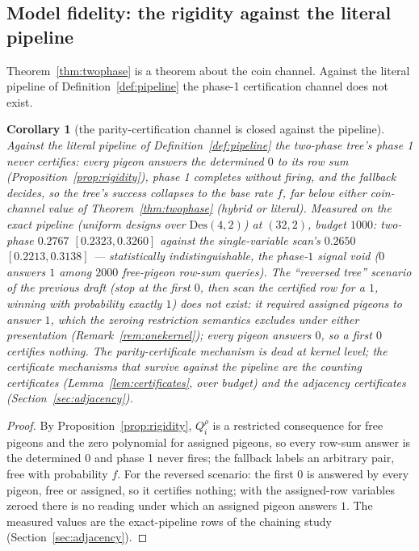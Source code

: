 \documentclass[11pt]{article}
\newtheorem{corollary}[theorem]{Corollary}
\theoremstyle{definition}
\theoremstyle{remark}
\newcommand{\Des}{\mathrm{Des}}
\begin{document}
\subsection{Model fidelity: the rigidity against the literal pipeline}

Theorem~\ref{thm:twophase} is a theorem about the coin channel.  Against
the literal pipeline of Definition~\ref{def:pipeline} the phase-1
certification channel does not exist.

\begin{corollary}[the parity-certification channel is closed against
the pipeline]\label{cor:closed}
Against the literal pipeline of Definition~\ref{def:pipeline} the
two-phase tree's phase 1 never certifies: every pigeon answers the
determined $0$ to its row sum (Proposition~\ref{prop:rigidity}), phase
1 completes without firing, and the fallback decides, so the tree's
success collapses to the base rate $f$, far below either coin-channel
value of Theorem~\ref{thm:twophase} (hybrid or literal).  Measured on
the exact pipeline (uniform designs over $\Des(4,2)$) at $(32,2)$,
budget $1000$: two-phase $0.2767$ $[0.2323,0.3260]$ against the
single-variable scan's $0.2650$ $[0.2213,0.3138]$ ---
statistically indistinguishable, the phase-$1$ signal void ($0$
answers $1$ among $2000$ free-pigeon row-sum queries).  The
``reversed tree'' scenario of the previous draft (stop at the first
$0$, then scan the certified row for a $1$, winning with probability
exactly $1$) does not exist: it required assigned pigeons to answer
$1$, which the zeroing restriction semantics excludes under either
presentation (Remark~\ref{rem:onekernel}); every pigeon answers $0$,
so a first $0$ certifies nothing.  The parity-certificate mechanism is
dead at kernel level; the certificate mechanisms that survive against
the pipeline are the counting certificates
(Lemma~\ref{lem:certificates}, over budget) and the adjacency
certificates (Section~\ref{sec:adjacency}).
\end{corollary}

\begin{proof}
By Proposition~\ref{prop:rigidity}, $Q_i^{\rho}$ is a restricted
consequence for free pigeons and the zero polynomial for assigned
pigeons, so every row-sum answer is the determined $0$ and phase 1
never fires; the fallback labels an arbitrary pair, free with
probability $f$.  For the reversed scenario: the first $0$ is answered
by every pigeon, free or assigned, so it certifies nothing; with the
assigned-row variables zeroed there is no reading under which an
assigned pigeon answers $1$.  The measured values are the exact-pipeline
rows of the chaining study (Section~\ref{sec:adjacency}).
\end{proof}
\end{document}
